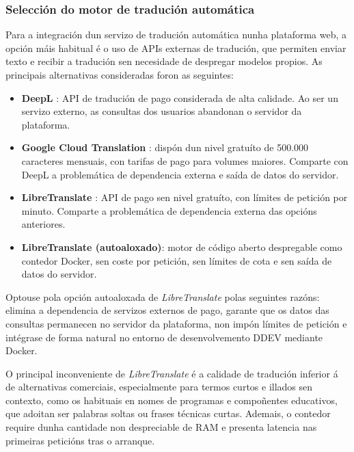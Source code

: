 \documentclass[%
    a4paper,               %
    twoside,               %
    10pt,                  %
]{article}                 %
\begin{document}
\subsubsection{Selección do motor de tradución automática}
\label{anx:libretranslate}

Para a integración dun servizo de tradución automática nunha plataforma web, a opción máis habitual é o uso de APIs externas de tradución, que permiten enviar texto e recibir a tradución sen necesidade de despregar modelos propios. As principais alternativas consideradas foron as seguintes:

\begin{itemize}
    \item \textbf{DeepL} \cite{deepl}: API de tradución de pago considerada de alta calidade. Ao ser un servizo externo, as consultas dos usuarios abandonan o servidor da plataforma.

    \item \textbf{Google Cloud Translation} \cite{google_translate}: dispón dun nivel gratuíto de 500.000 caracteres mensuais, con tarifas de pago para volumes maiores. Comparte con DeepL a problemática de dependencia externa e saída de datos do servidor.

    \item \textbf{LibreTranslate} \cite{libretranslate_portal}: API de pago sen nivel gratuíto, con límites de petición por minuto. Comparte a problemática de dependencia externa das opcións anteriores.

    \item \textbf{LibreTranslate (autoaloxado)}: motor de código aberto despregable como contedor Docker, sen coste por petición, sen límites de cota e sen saída de datos do servidor.
\end{itemize}

Optouse pola opción autoaloxada de \textit{LibreTranslate} polas seguintes razóns: elimina a dependencia de servizos externos de pago, garante que os datos das consultas permanecen no servidor da plataforma, non impón límites de petición e intégrase de forma natural no entorno de desenvolvemento DDEV mediante Docker.

O principal inconveniente de \textit{LibreTranslate} é a calidade de tradución inferior á de alternativas comerciais, especialmente para termos curtos e illados sen contexto, como os habituais en nomes de programas e compoñentes educativos, que adoitan ser palabras soltas ou frases técnicas curtas. Ademais, o contedor require dunha cantidade non despreciable de RAM e presenta latencia nas primeiras peticións tras o arranque.
\end{document}
